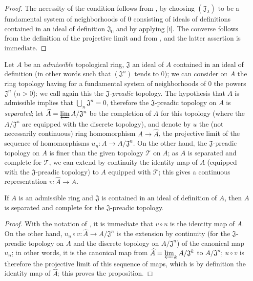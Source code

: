 \begin{proof}
\label{proof-0.7.2.2}
The necessity of the condition follows from , by choosing
$(\mathfrak{J}_\lambda)$ to be a fundamental system of neighborhoods of $0$
consisting of ideals of definitions contained in an ideal of definition
$\mathfrak{J}_0$ and by applying [i]. The converse follows
from the definition of the projective limit and from , and the
latter assertion is immediate.
\end{proof}

\begin{env}[7.2.3]
\label{0.7.2.3}
Let $A$ be an \emph{admissible} topological ring, $\mathfrak{J}$ an ideal of $A$
contained in an ideal of definition (in other words  such that
$(\mathfrak{J}^n)$ tends to $0$); we can consider on $A$ the ring topology
having for a fundamental system of neighborhoods of $0$ the powers
$\mathfrak{J}^n$ ($n>0$); we call again this the \emph{$\mathfrak{J}$-preadic}
topology. The hypothesis that $A$ is admissible implies that
$\bigcup_n\mathfrak{J}^n=0$, therefore the $\mathfrak{J}$-preadic topology on
$A$ is \emph{separated}; let $\widehat{A}=\varprojlim A/\mathfrak{J}^n$ be the
completion of $A$ for this topology (where the $A/\mathfrak{J}^n$ are equipped
with the discrete topology), and denote by $u$ the (not necessarily continuous)
ring homomorphism $A\to\widehat{A}$, the projective limit of the sequence of
homomorphisms $u_n:A\to A/\mathfrak{J}^n$. On the other hand, the
$\mathfrak{J}$-preadic topology on $A$ is finer than the given topology
$\mathcal{T}$ on $A$; as $A$ is separated and complete for $\mathcal{T}$, we can
extend by continuity the identity map of $A$ (equipped with the
$\mathfrak{J}$-preadic topology) to $A$ equipped with $\mathcal{T}$; this
gives a continuous representation $v:\widehat{A}\to A$.
\end{env}

\begin{proposition}[7.2.4]
\label{0.7.2.4}
If $A$ is an admissible ring and $\mathfrak{J}$ is contained in an ideal of
definition of $A$, then $A$ is separated and complete for the
$\mathfrak{J}$-preadic topology.
\end{proposition}

\begin{proof}
\label{proof-0.7.2.4}
With the notation of , it is immediate that
$v\circ u$ is the identity map of $A$. On the other hand,
$u_n\circ v:\widehat{A}\to A/\mathfrak{J}^n$ is the extension by continuity (for
the $\mathfrak{J}$-preadic topology on $A$ and the discrete topology on
$A/\mathfrak{J}^n$) of the canonical map $u_n$; in other words, it is the
canonical map from $\widehat{A}=\varprojlim_k A/\mathfrak{J}^k$ to
$A/\mathfrak{J}^n$; $u\circ v$ is therefore the projective limit of this
sequence of maps, which is by definition the identity map of
$\widehat{A}$; this proves the proposition.
\end{proof}

